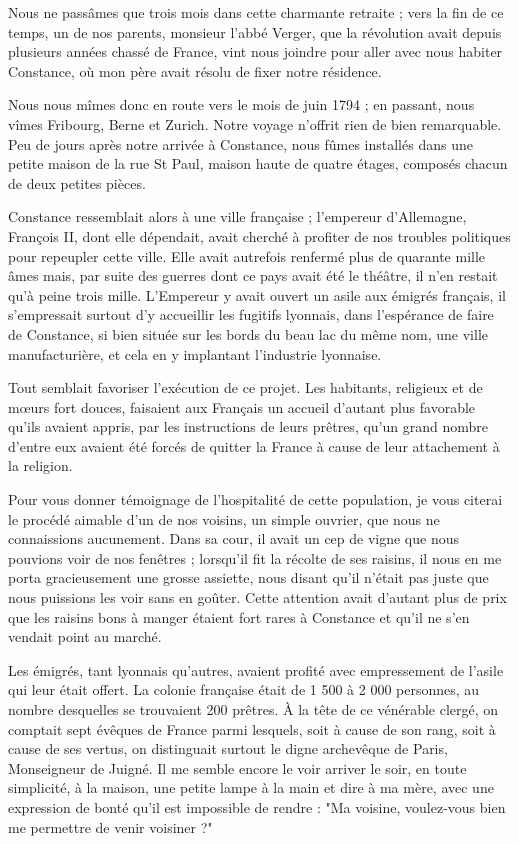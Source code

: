 \documentclass[11pt,a4paper]{report}
\begin{document}
Nous ne passâmes que trois mois dans cette charmante retraite ; vers la fin de ce temps, un de nos parents, monsieur l'abbé Verger, que la révolution avait depuis plusieurs années chassé de France, vint nous joindre pour aller avec nous habiter Constance, où mon père avait résolu de fixer notre résidence.

\vspace{0.3cm}\hrulefill\vspace{0.3cm}

Nous nous mîmes donc en route vers le mois de juin 1794 ; en passant, nous vîmes Fribourg, Berne et Zurich. Notre voyage n'offrit rien de bien remarquable. Peu de jours après notre arrivée à Constance, nous fûmes installés dans une petite maison de la rue St Paul, maison haute de quatre étages, composés chacun de deux petites pièces.

Constance ressemblait alors à une ville française ; l'empereur d'Allemagne, François II, dont elle dépendait, avait cherché à profiter de nos troubles politiques pour repeupler cette ville. Elle avait autrefois renfermé plus de quarante mille âmes mais, par suite des guerres dont ce pays avait été le théâtre, il n'en restait qu'à peine trois mille. L'Empereur y avait ouvert un asile aux émigrés français, il s'empressait surtout d'y accueillir les fugitifs lyonnais, dans l'espérance de faire de Constance, si bien située sur les bords du beau lac du même nom, une ville manufacturière, et cela en y implantant l'industrie lyonnaise.

Tout semblait favoriser l'exécution de ce projet. Les habitants, religieux et de mœurs fort douces, faisaient aux Français un accueil d'autant plus favorable qu'ils avaient appris, par les instructions de leurs prêtres, qu'un grand nombre d'entre eux avaient été forcés de quitter la France à cause de leur attachement à la religion.

Pour vous donner témoignage de l'hospitalité de cette population, je vous citerai le procédé aimable d'un de nos voisins, un simple ouvrier, que nous ne connaissions aucunement. Dans sa cour, il avait un cep de vigne que nous pouvions voir de nos fenêtres ; lorsqu'il fit la récolte de ses raisins, il nous en me porta gracieusement une grosse assiette, nous disant qu'il n'était pas juste que nous puissions les voir sans en goûter. Cette attention avait d'autant plus de prix que les raisins bons à manger étaient fort rares à Constance et qu'il ne s'en vendait point au marché.

Les émigrés, tant lyonnais qu'autres, avaient profité avec empressement de l'asile qui leur était offert. La colonie française était de 1 500 à 2 000 personnes, au nombre desquelles se trouvaient 200 prêtres. À la tête de ce vénérable clergé, on comptait sept évêques de France parmi lesquels, soit à cause de son rang, soit à cause de ses vertus, on distinguait surtout le digne archevêque de Paris, Monseigneur de Juigné. Il me semble encore le voir arriver le soir, en toute simplicité, à la maison, une petite lampe à la main et dire à ma mère, avec une expression de bonté qu'il est impossible de rendre : "Ma voisine, voulez-vous bien me permettre de venir voisiner ?"
\end{document}
